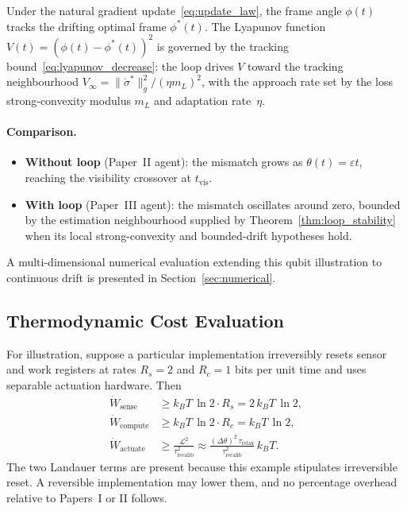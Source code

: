 \documentclass[12pt]{article}
\begin{document}
Under the natural gradient
update~\eqref{eq:update_law}, the frame angle
$\phi(t)$ tracks the drifting optimal frame
$\phi^*(t)$.
The Lyapunov function
$V(t) = (\phi(t) - \phi^*(t))^2$ is governed by the
tracking bound~\eqref{eq:lyapunov_decrease}:
the loop drives $V$ toward the tracking neighbourhood
$V_\infty = \|\dot{\sigma}^*\|_g^2/(\eta m_L)^2$,
with the approach rate set by the loss strong-convexity modulus $m_L$
and adaptation rate~$\eta$.

\paragraph{Comparison.}
\begin{itemize}
\item \textbf{Without loop} (Paper~II agent): the mismatch
  grows as $\theta(t)=\varepsilon t$, reaching the visibility
  crossover at $t_{\mathrm{vis}}$.
\item \textbf{With loop} (Paper~III agent): the mismatch
  oscillates around zero, bounded by the estimation
  neighbourhood supplied by Theorem~\ref{thm:loop_stability} when its
  local strong-convexity and bounded-drift hypotheses hold.
\end{itemize}

A multi-dimensional numerical evaluation extending
this qubit illustration to continuous drift is presented
in Section~\ref{sec:numerical}.

\subsection{Thermodynamic Cost Evaluation}
\label{subsec:cost_eval}

For illustration, suppose a particular implementation irreversibly
resets sensor and work registers at rates $R_s=2$ and $R_c=1$ bits per
unit time and uses separable actuation hardware.  Then
\begin{align}
\dot{W}_{\mathrm{sense}}
&\geq k_BT\,\ln 2 \cdot R_s
= 2\,k_BT\,\ln 2, \label{eq:cost_sense_ex} \\
\dot{W}_{\mathrm{compute}}
&\geq k_BT\,\ln 2 \cdot R_c
= k_BT\,\ln 2, \label{eq:cost_compute_ex} \\
\dot{W}_{\mathrm{actuate}}
&\geq \frac{\mathcal{L}^2}{\tau_{\mathrm{recalib}}^2}
\approx \frac{(\Delta\theta)^2\,\tau_{\mathrm{relax}}}
  {\tau_{\mathrm{recalib}}^2}\,k_BT.
  \label{eq:cost_actuate_ex}
\end{align}
The two Landauer terms are present because this example stipulates
irreversible reset.  A reversible implementation may lower them, and
no percentage overhead relative to Papers~I or II follows.
\end{document}
